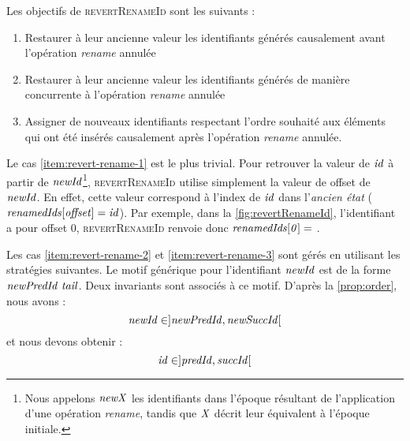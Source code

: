 Les objectifs de \textsc{revertRenameId} sont les suivants :
\begin{enumerate}
  \item \label{item:revert-rename-1}
    Restaurer à leur ancienne valeur les identifiants générés causalement avant l'opération \emph{rename} annulée
  \item \label{item:revert-rename-2}
    Restaurer à leur ancienne valeur les identifiants générés de manière concurrente à l'opération \emph{rename} annulée
  \item \label{item:revert-rename-3}
    Assigner de nouveaux identifiants respectant l'ordre souhaité aux éléments qui ont été insérés causalement après l'opération \emph{rename} annulée.
\end{enumerate}

Le cas \ref{item:revert-rename-1} est le plus trivial.
Pour retrouver la valeur de $\mathit{id}$ à partir de $\mathit{newId}$\footnote{Nous appelons $\mathit{newX}$ les identifiants dans l'époque résultant de l'application d'une opération \emph{rename}, tandis que $\mathit{X}$ décrit leur équivalent à l'époque initiale.}, \textsc{revertRenameId} utilise simplement la valeur de offset de $\mathit{newId}$.
En effet, cette valeur correspond à l'index de $\mathit{id}$ dans l'\emph{ancien état} (\ie $\mathit{renamedIds[offset]} = \mathit{id}$).
Par exemple, dans la \autoref{fig:revertRenameId}, l'identifiant  a pour offset 0, \textsc{revertRenameId} renvoie donc $\mathit{renamedIds[0]} =$ .

Les cas \ref{item:revert-rename-2} et \ref{item:revert-rename-3} sont gérés en utilisant les stratégies suivantes.
Le motif générique pour l'identifiant $\mathit{newId}$ est de la forme $\mathit{newPredId~tail}$.
Deux invariants sont associés à ce motif.
D'après la \autoref{prop:order}, nous avons :
\[\mathit{newId} \in ]\mathit{newPredId}, \mathit{newSuccId}[\]
et nous devons obtenir :
\[\mathit{id} \in ]\mathit{predId}, \mathit{succId}[\]

